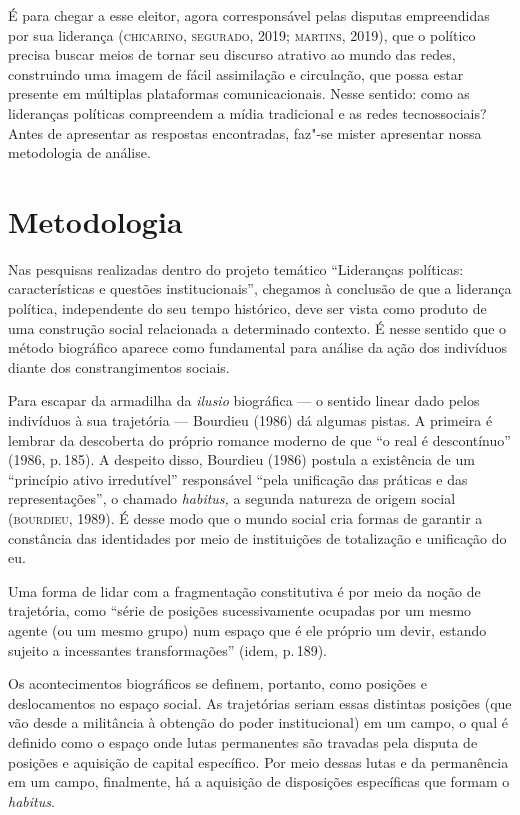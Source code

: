 É para chegar a esse eleitor, agora corresponsável pelas disputas
empreendidas por sua liderança (\textsc{chicarino}, \textsc{segurado}, 2019; \textsc{martins},
2019), que o político precisa buscar meios de tornar seu discurso
atrativo ao mundo das redes, construindo uma imagem de fácil assimilação
e circulação, que possa estar presente em múltiplas plataformas
comunicacionais. Nesse sentido: como as lideranças políticas compreendem
a mídia tradicional e as redes tecnossociais? Antes de apresentar as
respostas encontradas, faz"-se mister apresentar nossa metodologia de
análise.

\section{Metodologia}

Nas pesquisas realizadas dentro do projeto temático ``Lideranças
políticas: características e questões institucionais'', chegamos à
conclusão de que a liderança política, independente do seu tempo
histórico, deve ser vista como produto de uma construção social
relacionada a determinado contexto. É nesse sentido que o método
biográfico aparece como fundamental para análise da ação dos indivíduos
diante dos constrangimentos sociais.

Para escapar da armadilha da \textit{ilusio} biográfica --- o sentido
linear dado pelos indivíduos à sua trajetória --- Bourdieu (1986) dá
algumas pistas. A primeira é lembrar da descoberta do próprio romance
moderno de que ``o real é descontínuo'' (1986, p.\,185). A despeito
disso, Bourdieu (1986) postula a existência de um ``princípio ativo
irredutível'' responsável ``pela unificação das práticas e das
representações'', o chamado \textit{habitus,} a segunda natureza de origem
social (\textsc{bourdieu}, 1989). É desse modo que o mundo social cria formas de
garantir a constância das identidades por meio de instituições de
totalização e unificação do eu.

Uma forma de lidar com a fragmentação constitutiva é por meio da noção
de trajetória, como ``série de posições sucessivamente ocupadas por um
mesmo agente (ou um mesmo grupo) num espaço que é ele próprio um devir,
estando sujeito a incessantes transformações'' (idem, p.\,189).

Os acontecimentos biográficos se definem, portanto, como posições e
deslocamentos no espaço social. As trajetórias seriam essas distintas
posições (que vão desde a militância à obtenção do poder institucional)
em um campo, o qual é definido como o espaço onde lutas permanentes são
travadas pela disputa de posições e aquisição de capital específico. Por
meio dessas lutas e da permanência em um campo, finalmente, há a
aquisição de disposições específicas que formam o \textit{habitus}.


